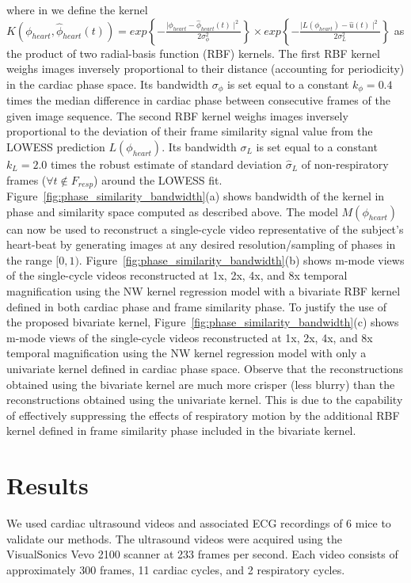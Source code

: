 \documentclass[journal]{IEEEtran}
\begin{document}
where in we define the kernel $K\left( \phi_{heart}, \hat{\phi}_{heart}(t) \right) = exp\left \{ -\frac{ \mid \phi_{heart} - \hat{\phi}_{heart}(t) \mid^2}{2  \sigma^2_\phi} \right \} \times exp\left \{ -\frac{ \mid L(\phi_{heart}) - \hat{u}(t) \mid^2}{2  \sigma^2_{L}} \right \}$ as the product of two radial-basis function (RBF) kernels. The first RBF kernel  weighs images inversely proportional to their distance (accounting for periodicity) in the cardiac phase space. Its bandwidth $\sigma_\phi$ is set equal to a constant $k_\phi = 0.4$ times the median difference in cardiac phase between consecutive frames of the given image sequence. The second RBF kernel weighs images inversely proportional to the deviation of their frame similarity signal value from the LOWESS prediction $L(\phi_{heart})$. Its bandwidth $\sigma_{L}$ is set equal to a constant $k_L = 2.0$ times the robust estimate of standard deviation $\hat{\sigma}_{L}$ of non-respiratory frames ($\forall t \notin F_{resp}$) around the LOWESS fit. Figure~\ref{fig:phase_similarity_bandwidth}(a) shows bandwidth of the kernel in phase and similarity space computed as described above. The model $M(\phi_{heart})$ can now be used to reconstruct a single-cycle video representative of the subject's heart-beat by generating images at any desired resolution/sampling of phases in the range $[0, 1)$.  Figure~\ref{fig:phase_similarity_bandwidth}(b) shows m-mode views of the single-cycle videos reconstructed at 1x, 2x, 4x, and 8x temporal magnification using the NW kernel regression model with a bivariate RBF kernel defined in both cardiac phase and frame similarity phase. To justify the use of the proposed bivariate kernel, Figure~\ref{fig:phase_similarity_bandwidth}(c) shows m-mode views of the single-cycle videos reconstructed at 1x, 2x, 4x, and 8x temporal magnification using the NW kernel regression model with only a univariate kernel defined in cardiac phase space. Observe that the reconstructions obtained using the bivariate kernel are much more crisper (less blurry) than the reconstructions obtained using the univariate kernel. This is due to the capability of effectively suppressing the effects of respiratory motion by the additional RBF kernel defined in frame similarity phase included in the bivariate kernel.
%
\section{Results}
\label{sec:results}
%
We used cardiac ultrasound videos and associated ECG recordings of 6 mice to validate our methods. The ultrasound videos were acquired using the VisualSonics Vevo 2100 scanner at 233 frames per second. Each video consists of approximately 300 frames, 11 cardiac cycles, and 2 respiratory cycles.
\end{document}
